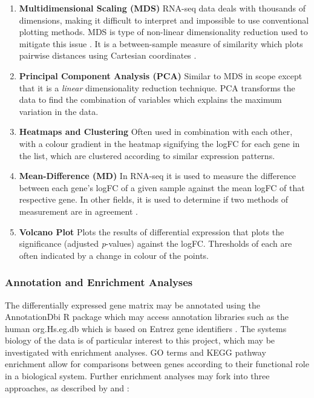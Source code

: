 \begin{enumerate}
\item[] \textbf{Multidimensional Scaling (MDS)} \hspace{0.15cm} RNA-seq data deals with thousands of dimensions, making it difficult to interpret and impossible to use conventional plotting methods. MDS is type of non-linear dimensionality reduction used to mitigate this issue \citep{yin2007nonlinear}. It is a between-sample measure of similarity which plots pairwise distances using Cartesian coordinates \citep{mead1992review}. 

\item[] \textbf{Principal Component Analysis (PCA)} \hspace{0.15cm} Similar to MDS in scope except that it is a \textit{linear} dimensionality reduction technique. PCA transforms the data to find the combination of variables which explains the maximum variation in the data. 

\item[] \textbf{Heatmaps and Clustering} \hspace{0.15cm} Often used in combination with each other, with a colour gradient in the heatmap signifying the \ac{logFC} for each gene in the list, which are clustered according to similar expression patterns.

\item[] \textbf{Mean-Difference (MD)} \hspace{0.15cm}  In RNA-seq it is used to measure the difference between each gene's \ac{logFC} of a given sample against the mean \ac{logFC} of that respective gene. In other fields, it is used to determine if two methods of measurement are in agreement \citep{fry2008visualizing}.

\item[] \textbf{Volcano Plot} \hspace{0.15cm} Plots the results of differential expression that plots the significance (adjusted \textit{p}-values) against the \ac{logFC}. Thresholds of each are often indicated by a change in colour of the points.
\end{enumerate} 


\subsubsection{Annotation and Enrichment Analyses}

The differentially expressed gene matrix may be annotated using the AnnotationDbi \citep{annotationdbi} R package which may access annotation libraries such as the human org.Hs.eg.db \citep{org.Hs.eg.db} which is based on Entrez gene identifiers \citep{maglott2005entrez}. The systems biology of the data is of particular interest to this project, which may be investigated with enrichment analyses. %
\ac{GO} terms and \ac{KEGG} \citep{kanehisa2017kegg} pathway enrichment allow for comparisons between genes according to their functional role in a biological system. Further enrichment analyses may fork into three approaches, as described by \cite{khatri2012ten} and \cite{alhamdoosh2017combining}:

